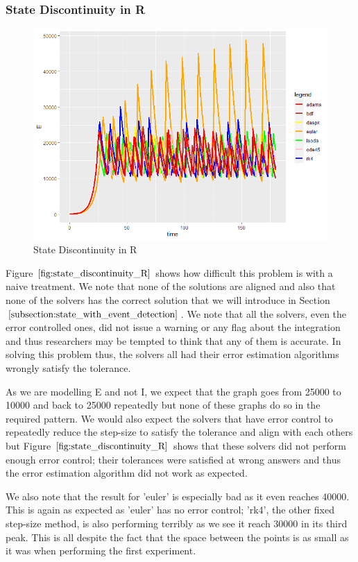 \subsubsection{State Discontinuity in R}
\begin{figure}[h]
	\centering
	\includegraphics[width=0.7\linewidth]{./figures/state_discontinuity_R}
	\caption{State Discontinuity in R}
	\label{fig:state_discontinuity_R}
\end{figure}
Figure $\ref{fig:state_discontinuity_R}$ shows how difficult this problem is with a naive treatment. We note that none of the solutions are aligned and also that none of the solvers has the correct solution that we will introduce in Section $\ref{subsection:state_with_event_detection}$. We note that all the solvers, even the error controlled ones, did not issue a warning or any flag about the integration and thus researchers may be tempted to think that any of them is accurate. In solving this problem thus, the solvers all had their error estimation algorithms wrongly satisfy the tolerance. 

As we are modelling E and not I, we expect that the graph goes from 25000 to 10000 and back to 25000 repeatedly but none of these graphs do so in the required pattern. We would also expect the solvers that have error control to repeatedly reduce the step-size to satisfy the tolerance and align with each others but Figure $\ref{fig:state_discontinuity_R}$ shows that these solvers did not perform enough error control; their tolerances were satisfied at wrong answers and thus the error estimation algorithm did not work as expected.

We also note that the result for 'euler' is especially bad as it even reaches 40000. This is again as expected as 'euler' has no error control; 'rk4', the other fixed step-size method, is also performing terribly as we see it reach 30000 in its third peak. This is all despite the fact that the space between the points is as small as it was when performing the first experiment.

